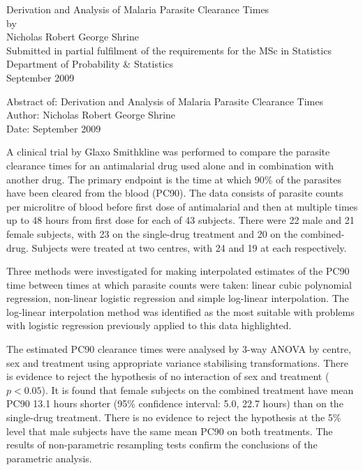 \documentclass[a4paper,12pt,openright,twoside]{book}
\begin{document}
\begin{titlepage}
\vspace*{\fill}
\begin{center}
{\huge Derivation and Analysis of Malaria Parasite Clearance Times}\\[1cm]
by\\[1cm]
{\large Nicholas Robert George Shrine}\\[4cm]
Submitted in partial fulfilment of the requirements for the MSc in Statistics\\
Department of Probability \& Statistics\\[2cm]
September 2009
\end{center}
\vspace*{\fill}
\end{titlepage}
\clearpage{\pagestyle{empty}\cleardoublepage}
\frontmatter
Abstract of: Derivation and Analysis of Malaria Parasite Clearance Times\\[0.5cm]
Author: Nicholas Robert George Shrine\\[0.5cm]
Date: September 2009\\[0.1cm]
\setlength{\parindent}{0.4in}
\setlength{\parskip}{0.0in}

A clinical trial by Glaxo Smithkline was performed to compare the parasite clearance times for an antimalarial drug used alone and in combination with another drug. The primary endpoint is the time at which 90\% of the parasites have been cleared from the blood (PC90). The data consists of parasite counts per microlitre of blood before first dose of antimalarial and then at multiple times up to 48 hours from first dose for each of 43 subjects. There were 22 male and 21 female subjects, with 23 on the single-drug treatment and 20 on the combined-drug. Subjects were treated at two centres, with 24 and 19 at each respectively. 

Three methods were investigated for making interpolated estimates of the PC90 time between times at which parasite counts were taken: linear cubic polynomial regression, non-linear logistic regression and simple log-linear interpolation. The log-linear interpolation method was identified as the most suitable with problems with logistic regression previously applied to this data highlighted.

The estimated PC90 clearance times were analysed by 3-way ANOVA by centre, sex and treatment using appropriate variance stabilising transformations. There is evidence to reject the hypothesis of no interaction of sex and treatment ($p<0.05$). It is found that female subjects on the combined treatment have mean PC90 13.1 hours shorter (95\% confidence interval: 5.0, 22.7 hours) than on the single-drug treatment. There is no evidence to reject the hypothesis at the 5\% level that male subjects have the same mean PC90 on both treatments. The results of non-parametric resampling tests confirm the conclusions of the parametric analysis.
\end{document}
